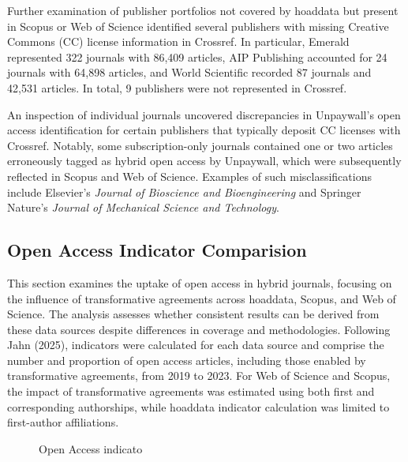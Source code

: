 \documentclass[a4paper,man,floatsintext,longtable,noextraspace,10pt]{apa6}
\begin{document}
Further examination of publisher portfolios not covered by hoaddata but
present in Scopus or Web of Science identified several publishers with
missing Creative Commons (CC) license information in Crossref. In
particular, Emerald represented 322 journals with 86,409 articles, AIP
Publishing accounted for 24 journals with 64,898 articles, and World
Scientific recorded 87 journals and 42,531 articles. In total, 9
publishers were not represented in Crossref.

An inspection of individual journals uncovered discrepancies in
Unpaywall's open access identification for certain publishers that
typically deposit CC licenses with Crossref. Notably, some
subscription-only journals contained one or two articles erroneously
tagged as hybrid open access by Unpaywall, which were subsequently
reflected in Scopus and Web of Science. Examples of such
misclassifications include Elsevier's \emph{Journal of Bioscience and
Bioengineering} and Springer Nature's \emph{Journal of Mechanical
Science and Technology}.

\subsection{Open Access Indicator
Comparision}\label{open-access-indicator-comparision}

This section examines the uptake of open access in hybrid journals,
focusing on the influence of transformative agreements across hoaddata,
Scopus, and Web of Science. The analysis assesses whether consistent
results can be derived from these data sources despite differences in
coverage and methodologies. Following Jahn (2025), indicators were
calculated for each data source and comprise the number and proportion
of open access articles, including those enabled by transformative
agreements, from 2019 to 2023. For Web of Science and Scopus, the impact
of transformative agreements was estimated using both first and
corresponding authorships, while hoaddata indicator calculation was
limited to first-author affiliations.

\begin{figure}[ht!]


\caption{\label{fig-uptake_overview}Open Access indicato}

\end{figure}%
\end{document}
